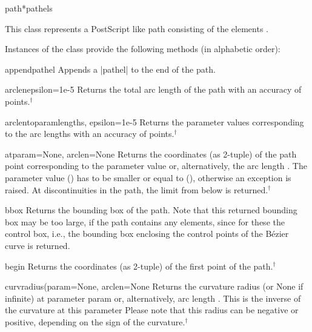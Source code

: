 \begin{classdesc}{path}{*pathels}

This class represents a PostScript like path consisting of the
elements .

Instances of the class  provide the following
methods (in alphabetic order):

\begin{methoddesc}{append}{pathel}
Appends a \var|pathel| to the end of the path.
\end{methoddesc}

\begin{methoddesc}{arclen}{epsilon=1e-5}
Returns the total arc length of the path with an accuracy of
 points.$^\dagger$
\end{methoddesc}

\begin{methoddesc}{arclentoparam}{lengths, epsilon=1e-5}
  Returns the parameter values corresponding to the arc lengths
   with an accuracy of  points.$^\dagger$
\end{methoddesc}

\begin{methoddesc}{at}{param=None, arclen=None}
  Returns the coordinates (as 2-tuple) of the path point corresponding to the
  parameter value  or, alternatively, the arc length
  . The parameter value  () has to be smaller
  or equal to  (),
  otherwise an exception is raised.  At discontinuities in the path,
  the limit from below is returned.$^\dagger$
\end{methoddesc}

\begin{methoddesc}{bbox}{}
  Returns the bounding box of the path. Note that this returned
  bounding box may be too large, if the path contains any
   elements, since for these the control box, i.e., the
  bounding box enclosing the control points of the B\'ezier curve is
  returned.
\end{methoddesc}

\begin{methoddesc}{begin}{}
  Returns the coordinates (as 2-tuple) of the first point of the path.$^\dagger$
\end{methoddesc}

\begin{methoddesc}{curvradius(param=None, arclen=None}
  Returns the curvature radius (or None if infinite) at parameter
  param or, alternatively, arc length .  This is the
  inverse of the curvature at this parameter Please note that this
  radius can be negative or positive, depending on the sign of the
  curvature.$^\dagger$
\end{methoddesc}


\end{classdesc}
